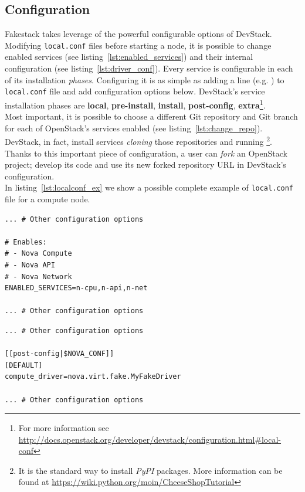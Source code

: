 \subsection{Configuration}
\label{sub:fakestack_conf}

Fakestack takes leverage of the powerful configurable options of DevStack. Modifying \texttt{local.conf} files before starting a node, it is possible to change enabled services (see listing~\ref{lst:enabled_services}) and their internal configuration (see listing~\ref{lst:driver_conf}). Every service is configurable in each of its installation \textit{phases}. Configuring it is as simple as adding a  line (e.g. ) to \texttt{local.conf} file and add configuration options below. DevStack's service installation phases are \textbf{local}, \textbf{pre-install}, \textbf{install}, \textbf{post-config}, \textbf{extra}\footnote{For more information see \url{http://docs.openstack.org/developer/devstack/configuration.html\#local-conf}}.\\
Most important, it is possible to choose a different Git repository and Git branch for each of OpenStack's services enabled (see listing~\ref{lst:change_repo}). DevStack, in fact, install services \textit{cloning} those repositories and running \footnote{\label{note:pypi}It is the standard way to install \textit{PyPI} packages. More information can be found at \url{https://wiki.python.org/moin/CheeseShopTutorial}}.\\
Thanks to this important piece of configuration, a user can \textit{fork} an OpenStack project; develop its code and use its new forked repository URL in DevStack's configuration.\\
In listing~\ref{lst:localconf_ex} we show a possible complete example of \texttt{local.conf} file for a compute node.

\begin{lstlisting}[floatplacement=H, caption={Choose OpenStack's enabled services}, label={lst:enabled_services}, numbers=none]
... # Other configuration options

# Enables:
# - Nova Compute
# - Nova API
# - Nova Network
ENABLED_SERVICES=n-cpu,n-api,n-net

... # Other configuration options
\end{lstlisting}

\begin{lstlisting}[floatplacement=H, caption={Internal configuration of Nova}, label={lst:driver_conf}, numbers=none]
... # Other configuration options

[[post-config|$NOVA_CONF]]
[DEFAULT]
compute_driver=nova.virt.fake.MyFakeDriver

... # Other configuration options
\end{lstlisting}

